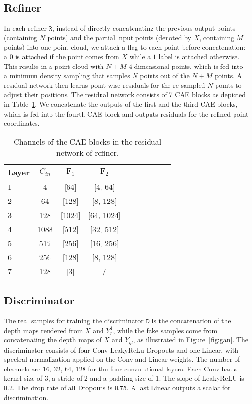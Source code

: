 \documentclass[final]{cvpr}
\begin{document}
\subsection{Refiner}
In each refiner $\mathtt{R}$, instead of directly concatenating the previous output points (containing $N$ points) and the partial input points (denoted by $X$, containing $M$ points) into one point cloud, we attach a flag to each point before concatenation: a $0$ is attached if the point comes from $X$ while a $1$ label is attached otherwise. This results in a point cloud with $N+M$ $4$-dimensional points,
which is fed into a minimum density sampling \cite{liu2019morphing} that samples $N$ points out of the $N+M$ points. 
A residual network then learns point-wise residuals for the re-sampled $N$ points to adjust their positions. The residual network consists of 7 CAE blocks as depicted in Table~\ref{table:network_residual_network}.
We concatenate the outputs of the first and the third CAE blocks, which is fed into the fourth CAE block and outputs residuals for the refined point coordinates.


\begin{table}[h]
\begin{center}
\footnotesize
\setlength\tabcolsep{1.5pt}
\begin{tabular}{@{}l|cccccccc|c@{}}
\toprule
Layer & $C_{in}$ & $\mathbf{F}_1$ & $\mathbf{F}_2$  \\
\midrule
1& 4 & [64] &[4, 64] \\
2& 64 & [128] &[8, 128]\\
3& 128 & [1024]&[64, 1024]\\
4& 1088 & [512] &[32, 512] \\
5& 512 & [256] &[16, 256] \\
6& 256 & [128] &[8, 128] \\
7& 128 & [3] & / \\
\bottomrule
\end{tabular}
\end{center}
\caption{Channels of the CAE blocks in the residual network of refiner.}
\label{table:network_residual_network}
\end{table}

\subsection{Discriminator}
The real samples for training the discriminator $\mathtt{D}$ is the concatenation of the depth maps rendered from $X$ and $Y_r^1$,
while the fake samples come from concatenating the depth maps of $X$ and $Y_{gt}$, as illustrated in Figure~\ref{fig:gan}. 
The discriminator consists of four Conv-LeakyReLu-Dropouts and one Linear, with spectral normalization \cite{miyato2018spectral} applied on the Conv and Linear weights. The number of channels are $16$, $32$, $64$, $128$ for the four convolutional layers. Each Conv has a kernel size of 3, a stride of 2 and a padding size of 1. The slope of LeakyReLU is 0.2. The drop rate of all Dropouts is 0.75.
A last Linear outputs a scalar for discrimination. 
\end{document}
